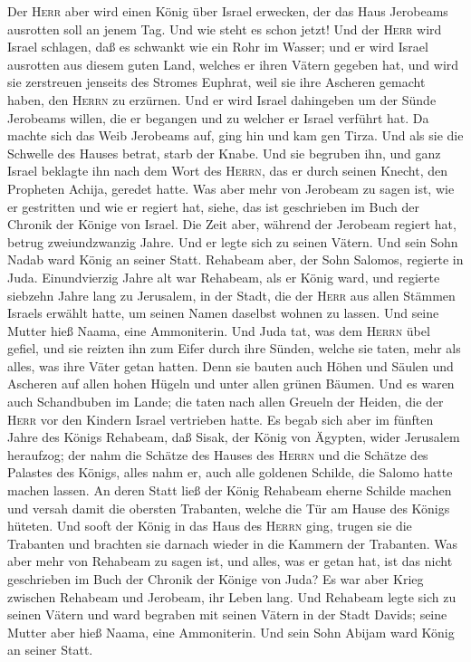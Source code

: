  Der \textsc{Herr} aber wird einen König über Israel
erwecken, der das Haus Jerobeams ausrotten soll an jenem Tag. Und wie
steht es schon jetzt!  Und der \textsc{Herr} wird Israel
schlagen, daß es schwankt wie ein Rohr im Wasser; und er wird Israel
ausrotten aus diesem guten Land, welches er ihren Vätern gegeben hat,
und wird sie zerstreuen jenseits des Stromes Euphrat, weil sie ihre
Ascheren gemacht haben, den \textsc{Herrn} zu erzürnen. 
Und er wird Israel dahingeben um der Sünde Jerobeams willen, die er
begangen und zu welcher er Israel verführt hat.  Da
machte sich das Weib Jerobeams auf, ging hin und kam gen Tirza. Und als
sie die Schwelle des Hauses betrat, starb der Knabe.  Und
sie begruben ihn, und ganz Israel beklagte ihn nach dem Wort des
\textsc{Herrn}, das er durch seinen Knecht, den Propheten Achija,
geredet hatte.  Was aber mehr von Jerobeam zu sagen ist,
wie er gestritten und wie er regiert hat, siehe, das ist geschrieben im
Buch der Chronik der Könige von Israel.  Die Zeit aber,
während der Jerobeam regiert hat, betrug zweiundzwanzig Jahre. Und er
legte sich zu seinen Vätern. Und sein Sohn Nadab ward König an seiner
Statt.  Rehabeam aber, der Sohn Salomos, regierte in
Juda. Einundvierzig Jahre alt war Rehabeam, als er König ward, und
regierte siebzehn Jahre lang zu Jerusalem, in der Stadt, die der
\textsc{Herr} aus allen Stämmen Israels erwählt hatte, um seinen Namen
daselbst wohnen zu lassen. Und seine Mutter hieß Naama, eine
Ammoniterin.  Und Juda tat, was dem \textsc{Herrn} übel
gefiel, und sie reizten ihn zum Eifer durch ihre Sünden, welche sie
taten, mehr als alles, was ihre Väter getan hatten.  Denn
sie bauten auch Höhen und Säulen und Ascheren auf allen hohen Hügeln und
unter allen grünen Bäumen.  Und es waren auch Schandbuben
im Lande; die taten nach allen Greueln der Heiden, die der \textsc{Herr}
vor den Kindern Israel vertrieben hatte.  Es begab sich
aber im fünften Jahre des Königs Rehabeam, daß Sisak, der König von
Ägypten, wider Jerusalem heraufzog;  der nahm die Schätze
des Hauses des \textsc{Herrn} und die Schätze des Palastes des Königs,
alles nahm er, auch alle goldenen Schilde, die Salomo hatte machen
lassen.  An deren Statt ließ der König Rehabeam eherne
Schilde machen und versah damit die obersten Trabanten, welche die Tür
am Hause des Königs hüteten.  Und sooft der König in das
Haus des \textsc{Herrn} ging, trugen sie die Trabanten und brachten sie
darnach wieder in die Kammern der Trabanten.  Was aber
mehr von Rehabeam zu sagen ist, und alles, was er getan hat, ist das
nicht geschrieben im Buch der Chronik der Könige von Juda?
 Es war aber Krieg zwischen Rehabeam und Jerobeam, ihr
Leben lang.  Und Rehabeam legte sich zu seinen Vätern und
ward begraben mit seinen Vätern in der Stadt Davids; seine Mutter aber
hieß Naama, eine Ammoniterin. Und sein Sohn Abijam ward König an seiner
Statt.

